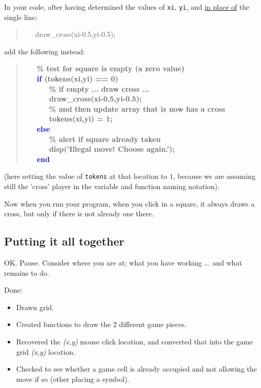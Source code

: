 \documentclass{tufte-book} %
\newenvironment{docspec}{\begin{quotation}\ttfamily\parskip0pt\parindent0pt\ignorespaces}{\end{quotation}}
\newenvironment{docspecbold}{\begin{quotation}\ttfamily\bfseries\parskip0pt\parindent0pt\ignorespaces}{\end{quotation}}
\begin{document}
In your code, after having determined the values of \texttt{xi}, \texttt{yi}, and \uline{in place of} the single line:
\begin{docspec}
\ \ \  draw\_cross(xi-0.5,yi-0.5);
\end{docspec}
add the following instead:
\begin{docspecbold}
\ \ \ \textcolor[rgb]{0,0.501961,0}{\% test for square is empty (a zero value)}\\
\ \ \     \textcolor{blue}{if} (tokens(xi,yi) == 0)\\
\ \ \ \ \ \ \textcolor[rgb]{0,0.501961,0}{\% if empty ... draw cross ...}\\
\ \ \ \ \ \         draw\_cross(xi-0.5,yi-0.5);\\
\ \ \ \ \ \ \textcolor[rgb]{0,0.501961,0}{\% and then update array that is now has a cross}\\
\ \ \ \ \ \        tokens(xi,yi) = 1;\\
\ \ \     \textcolor{blue}{else}\\
\ \ \ \ \ \ \textcolor[rgb]{0,0.501961,0}{\% alert if square already taken}\\
\ \ \ \ \ \         disp(\textcolor[rgb]{1,0,1}{'Illegal move! Choose again.'});\\
\ \ \     \textcolor{blue}{end}
\end{docspecbold}
(here setting the value of \texttt{tokens} at that location to \(1\), because we are assuming still the 'cross' player in the variable and function naming notation).

Now when you run your program, when you click in a square, it always draws a cross, but only if there is not already one there.


\subsection{Putting it all together}

OK. Pause. Consider where you are at; what you have working ... and what remains to do.

\vspace{1mm}
Done:
\begin{itemize}[noitemsep]
\setlength{\itemindent}{.2in}
\item Drawn grid.
\item Created functions to draw the 2 different game pieces.
\item Recovered the \textit{(x,y)} mouse click location, and converted that into the game grid \textit{(x,y)} location.
\item Checked to see whether a game cell is already occupied and not allowing the move if so (other placing a symbol).
\end{itemize}
\end{document}
